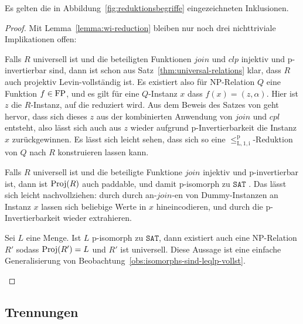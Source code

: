 \begin{lemma}
    Es gelten die in Abbildung~\ref{fig:reduktionsbegriffe} eingezeichneten Inklusionen.
\end{lemma}
\begin{proof}
    Mit Lemma~\ref{lemma:wi-reduction} bleiben nur noch drei nichttriviale Implikationen offen:
    \begin{prooflist}
        \item Falls $R$ universell ist und die beteiligten Funktionen $\mathit{join}$ und $\mathit{clp}$ injektiv und p-invertierbar sind, dann ist schon aus Satz~\ref{thm:universal-relations} klar, dass $R$ auch projektiv Levin-vollständig ist.
            Es existiert also für NP-Relation $Q$ eine Funktion $f\in\mathrm{FP}$, und es gilt für eine $Q$-Instanz $x$ dass $f(x)=(z,\alpha)$. Hier ist $z$ die $R$-Instanz, auf die reduziert wird.
            Aus dem Beweis des Satzes von \textcite{agrawal_universal_1992} geht hervor, dass sich dieses $z$ aus der kombinierten Anwendung von $\mathit{join}$ und $\mathit{cpl}$ entsteht, also lässt sich auch aus $z$ wieder aufgrund p-Invertierbarkeit die Instanz $x$ zurückgewinnen.
            Es lässt sich leicht sehen, dass sich so eine $\leq_\mathrm{L,1,i}^\mathrm p$-Reduktion von $Q$ nach $R$ konstruieren lassen kann.
        \item  Falls $R$ universell ist und die beteiligte Funktione $\mathit{join}$ injektiv und p-invertierbar ist, dann ist $\operatorname{Proj}(R)$ auch paddable, und damit p-isomorph zu $\mathtt{SAT}$ \parencite[Thm.~8.2]{agrawal_universal_1992}. Das lässt sich leicht nachvollziehen: durch  durch an-$\mathit{join}$-en von Dummy-Instanzen an Instanz $x$ lassen sich beliebige Werte in $x$ hineincodieren, und durch die p-Invertierbarkeit wieder extrahieren.
        \item Sei $L$ eine Menge. Ist $L$ p-isomorph zu $\mathtt{SAT}$, dann existiert auch eine NP-Relation $R'$ sodass $\operatorname{Proj}(R')=L$ und $R'$ ist universell. Diese Aussage ist eine einfache Generalisierung von Beobachtung~\ref{obs:isomorphs-sind-leqlp-vollst}.
    \end{prooflist}
\end{proof}

\subsection*{Trennungen}

